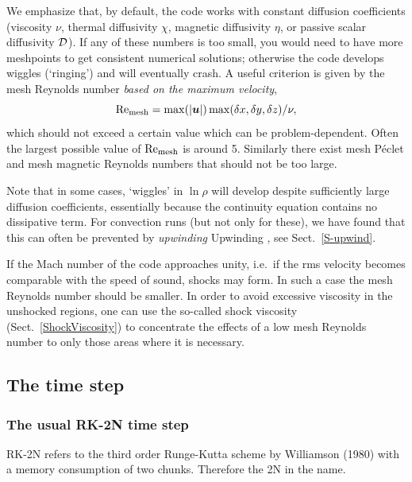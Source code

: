 \documentclass[\mydriver,12pt,twoside,notitlepage,a4paper]{article}
\makeatletter
\newcommand{\name}[2][]{%
  \def\index@{#1}%
  \textsl{#2\/}%
  \ifx\index@\@empty\index{#2@\MakeUppercase #2}%
  \else\index{#1}%
  \fi%
}
\renewcommand{\vec}[1]{\mbox{\boldmath{$#1$}}}
\newcommand{\uv}            {\vec{u}}
\makeatother
\begin{document}
We emphasize that, by default,
the code works with constant diffusion coefficients
(viscosity $\nu$, thermal diffusivity $\chi$, magnetic diffusivity $\eta$,
or passive scalar diffusivity ${\cal D}$).
If any of these numbers is too small, you would need to have more
meshpoints to get consistent numerical solutions; otherwise the code
develops wiggles (`ringing') and will eventually crash.
A useful criterion is given by the
mesh Reynolds number {\em based on the maximum velocity},
\begin{equation}
  \mbox{Re}_{\rm mesh}=\max(|\uv|)\max(\delta x,\delta y,\delta z)/\nu,
\end{equation}
which should not exceed a certain value which can be problem-dependent.
Often the largest possible value of $\mbox{Re}_{\rm mesh}$ is around 5.
Similarly there exist mesh P\'eclet and mesh magnetic Reynolds numbers that
should not be too large.

Note that in some cases, `wiggles' in $\ln\rho$ will develop despite
sufficiently large diffusion coefficients, essentially because the
continuity equation contains no dissipative term.
For convection runs (but not only for these), we have found that this can
often be prevented by \name[Upwinding]{upwinding}, see Sect.~\ref{S-upwind}.

If the Mach number of the code approaches unity, i.e.\ if the rms velocity
becomes comparable with the speed of sound, shocks may form.
In such a case the mesh Reynolds number should be smaller.
In order to avoid excessive viscosity in the unshocked regions,
one can use the so-called shock viscosity (Sect.~\ref{ShockViscosity})
to concentrate the effects of a low mesh Reynolds number to only those
areas where it is necessary.


\subsection{The time step}
\label{time-step}

\subsubsection{The usual RK-2N time step}

RK-2N refers to the third order Runge-Kutta scheme by Williamson (1980)
with a memory consumption of two chunks.
Therefore the 2N in the name.
\end{document}
